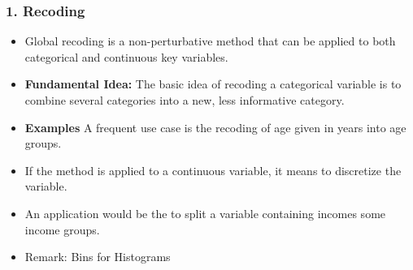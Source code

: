 \documentclass{beamer}
\begin{document}
\begin{frame}
\frametitle{1. Recoding}
\begin{itemize}
\item Global recoding is a non-perturbative method that can be applied to both categorical and continuous key variables.
\item \textbf{Fundamental Idea:} The basic idea of recoding a categorical variable
is to combine several categories into a new, less informative category. 
\item \textbf{Examples} A frequent
use case is the recoding of age given in years into age groups.
\item  If the method is applied to a continuous variable, it means to discretize the variable. 
\item An application
would be the to split a variable containing incomes some income groups.
\item Remark: Bins for Histograms
\end{itemize}
\end{frame}
\end{document}
